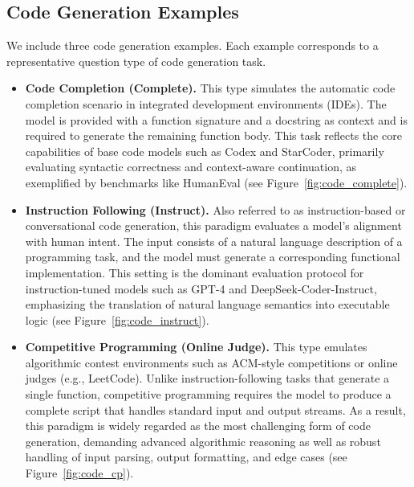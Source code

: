 \subsection{Code Generation Examples}
We include three code generation examples.
Each example corresponds to a representative question type of code generation task.



\begin{itemize}
    \item \textbf{Code Completion (Complete).}
    This type simulates the automatic code completion scenario in
    integrated development environments (IDEs).
    The model is provided with a function signature and a docstring as context
    and is required to generate the remaining function body.
    This task reflects the core capabilities of base code models such as
    Codex and StarCoder, primarily evaluating syntactic correctness and
    context-aware continuation, as exemplified by benchmarks like HumanEval
    (see Figure~\ref{fig:code_complete}).

    \item \textbf{Instruction Following (Instruct).}
    Also referred to as instruction-based or conversational code generation,
    this paradigm evaluates a model's alignment with human intent.
    The input consists of a natural language description of a programming task,
    and the model must generate a corresponding functional implementation.
    This setting is the dominant evaluation protocol for instruction-tuned
    models such as GPT-4 and DeepSeek-Coder-Instruct, emphasizing the
    translation of natural language semantics into executable logic
    (see Figure~\ref{fig:code_instruct}).

    \item \textbf{Competitive Programming (Online Judge).}
    This type emulates algorithmic contest environments such as ACM-style
    competitions or online judges (e.g., LeetCode).
    Unlike instruction-following tasks that generate a single function,
    competitive programming requires the model to produce a complete script
    that handles standard input and output streams.
    As a result, this paradigm is widely regarded as the most challenging
    form of code generation, demanding advanced algorithmic reasoning as well
    as robust handling of input parsing, output formatting, and edge cases
    (see Figure~\ref{fig:code_cp}).
\end{itemize}


